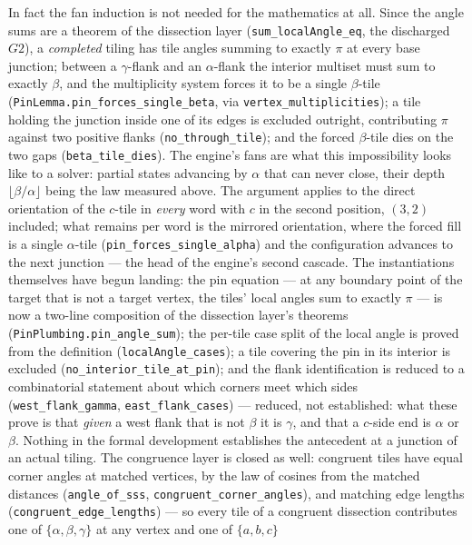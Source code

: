 \documentclass[11pt,reqno]{amsart}
\theoremstyle{plain}
\theoremstyle{definition}
\begin{document}
In fact the fan induction is not needed for the mathematics at all. Since the angle sums are a
theorem of the dissection layer (\texttt{sum\_localAngle\_eq}, the discharged $G2$), a
\emph{completed} tiling has tile angles summing to exactly $\pi$ at every base junction; between a
$\gamma$-flank and an $\alpha$-flank the interior multiset must sum to exactly $\beta$, and the
multiplicity system forces it to be a single $\beta$-tile
(\texttt{PinLemma.pin\_forces\_single\_beta}, via \texttt{vertex\_multiplicities}); a tile
holding the junction inside one of its edges is excluded outright, contributing $\pi$ against two
positive flanks (\texttt{no\_through\_tile}); and the forced $\beta$-tile dies on the two gaps
(\texttt{beta\_tile\_dies}). The engine's fans are what this impossibility looks like to a
solver: partial states advancing by $\alpha$ that can never close, their depth
$\lfloor\beta/\alpha\rfloor$ being the law measured above. The argument applies to the direct
orientation of the $c$-tile in \emph{every} word with $c$ in the second position, $(3,2)$
included; what remains per word is the mirrored orientation, where the forced fill is a single
$\alpha$-tile (\texttt{pin\_forces\_single\_alpha}) and the configuration advances to the next
junction --- the head of the engine's second cascade. The instantiations themselves have begun landing: the pin equation --- at any boundary point of
the target that is not a target vertex, the tiles' local angles sum to exactly $\pi$ --- is now a
two-line composition of the dissection layer's theorems
(\texttt{PinPlumbing.pin\_angle\_sum}); the per-tile case split of the local angle is proved
from the definition (\texttt{localAngle\_cases}); a tile covering the pin in its interior is
excluded (\texttt{no\_interior\_tile\_at\_pin}); and the flank identification is reduced to a
combinatorial statement about which corners meet which sides (\texttt{west\_flank\_gamma},
\texttt{east\_flank\_cases}) --- reduced, not established: what these prove is that \emph{given}
a west flank that is not $\beta$ it is $\gamma$, and that a $c$-side end is $\alpha$ or $\beta$.
Nothing in the formal development establishes the antecedent at a junction of an actual tiling. The congruence layer is
closed as well: congruent tiles have equal corner angles at matched vertices, by the law of cosines
from the matched distances (\texttt{angle\_of\_sss}, \texttt{congruent\_corner\_angles}), and
matching edge lengths (\texttt{congruent\_edge\_lengths}) --- so every tile of a congruent
dissection contributes one of $\{\alpha,\beta,\gamma\}$ at any vertex and one of $\{a,b,c\}$
\end{document}
